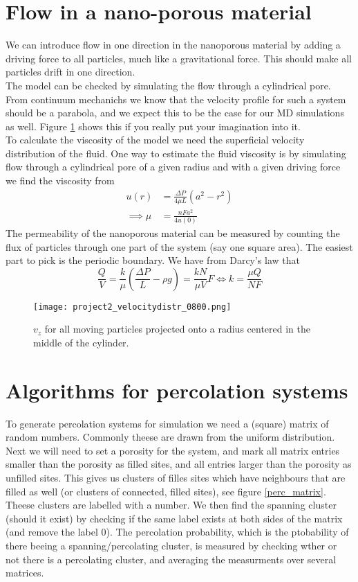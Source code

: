 \documentclass[a4paper,english, 10pt, twoside]{article}
\begin{document}
\section{Flow in a nano-porous material}
We can introduce flow in one direction in the nanoporous material by adding a driving force to all particles, much like a gravitational force.
This should make all particles drift in one direction.\\
The model can be checked by simulating the flow through a cylindrical pore. From continuum mechanichs we know that the velocity profile for 
such a system should be a parabola, and we expect this to be the case for our MD simulations as well. Figure \ref{vel_profile} shows this 
if you really put your imagination into it.\\
To calculate the viscosity of the model we need the superficial velocity distribution of the fluid. One way to estimate the fluid viscosity is 
by simulating flow through a cylindrical pore of a given radius and with a given driving force we find the viscosity from
\begin{align*}
 u(r) &= \frac{\Delta P}{4\mu L}\left(a^2-r^2\right)\\
 \implies \mu &= \frac{nFa^2}{4u(0)}
\end{align*}
The permeability of the nanoporous material can be measured by counting the flux of particles through one part of the system (say one square 
area). The easiest part to pick is the periodic boundary. We have from Darcy's law that
\begin{equation}
 \frac{Q}{V} = \frac{k}{\mu}\left(\frac{\Delta P}{L}-\rho g\right) = \frac{kN}{\mu V}F \Longleftrightarrow k = \frac{\mu Q}{NF}
\end{equation}

\begin{figure}[H]
\centering
\texttt{[image: project2\_velocitydistr\_0800.png]}
\caption{$v_z$ for all moving particles projected onto a radius centered in the middle of the cylinder.}
\label{vel_profile}
\end{figure}


\section{Algorithms for percolation systems}
To generate percolation systems for simulation we need a (square) matrix of random numbers. Commonly theese are drawn from the 
uniform distribution. Next we will need to set a porosity for the system, and mark all matrix entries smaller than the porosity 
as filled sites, and all entries larger than the porosity as unfilled sites. This gives us clusters of filles sites which have 
neighbours that are filled as well (or clusters of connected, filled sites), see figure \ref{perc_matrix}. Theese clusters are labelled with a number.
We then find the spanning cluster (should it exist) by checking if the same label exists at both sides of the matrix (and remove the label 0). 
The percolation probability, which is the ptobability of there beeing a spanning/percolating cluster, is measured by checking wther or not there is 
a percolating cluster, and averaging the measurments over several matrices.
\end{document}
